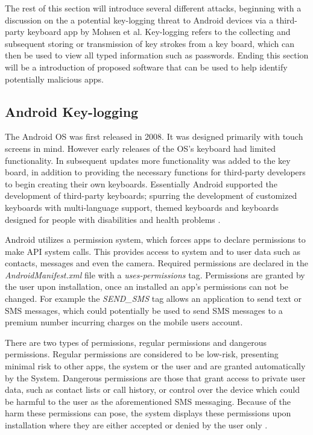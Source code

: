 \documentclass{sig-alternate}
\begin{document}
 
  The rest of this section will introduce several different attacks,  beginning with a discussion on the a potential key-logging threat to Android devices via a third-party keyboard app by Mohsen et al. Key-logging refers to the collecting and subsequent storing or transmission of key strokes from a key board, which can then be used to view all typed information such as passwords. Ending this section will be a introduction of proposed software that can be used to help identify potentially malicious apps. 
  
	\subsection{Android Key-logging}
	\label{app}        
	The Android OS was first released in 2008. It was designed primarily with touch screens in mind. However early releases of the OS's keyboard had limited functionality. In subsequent updates more functionality was added to the key board, in addition to providing the necessary functions for third-party developers to begin creating their own keyboards. Essentially Android supported the development of third-party keyboards; spurring the development of customized keyboards with multi-language support, themed keyboards and keyboards designed for people with disabilities and health problems \cite{Keylogging}.
	
	Android utilizes a permission system, which forces apps to declare permissions to make API system calls. This provides access to system and to user data such as contacts, messages and even the camera. Required permissions are declared in the \textit{AndroidManifest.xml} file with a \textit{uses-permissions} tag. Permissions are granted by the user upon installation, once an installed an app's permissions can not be changed. For example the \textit{SEND\_SMS} tag allows an application to send text or SMS messages, which could potentially be used to send SMS messages to a premium number incurring charges on the mobile users account.
	
	 There are two types of permissions, regular permissions and dangerous permissions. Regular permissions are considered to be low-risk, presenting minimal risk to other apps, the system or the user and are granted automatically by the System. Dangerous permissions are those that grant access to private user data, such as contact lists or call history, or control over the device which could be harmful to the user as the aforementioned SMS messaging. Because of the harm these permissions can pose, the system displays these permissions upon installation where they are either accepted or denied by the user only \cite{Keylogging}.
	 
\end{document}

